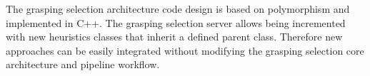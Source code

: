 \begin{figure}[h!]
\end{figure}

The grasping selection architecture code design is based on polymorphism and implemented in C++. The grasping selection server allows being incremented with new heuristics classes that inherit a defined parent class. Therefore new approaches can be easily integrated without modifying the grasping selection core architecture and pipeline workflow.  

